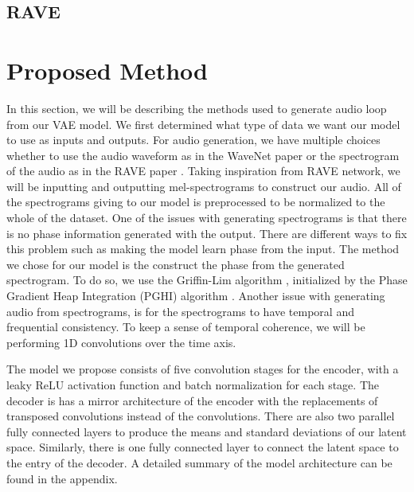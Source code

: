 \documentclass{article}
\begin{document}
\subsection{RAVE}


\newpage


\section{Proposed Method}


In this section, we will be describing the methods used to generate audio loop from our VAE model. 
We first determined what type of data we want our model to use as inputs and outputs. For audio generation, we have multiple choices whether to use the audio waveform as in the WaveNet paper \cite{oord2016wavenet} or the spectrogram of the audio as in the RAVE paper \cite{caillonRAVEVariationalAutoencoder2021}. Taking inspiration from RAVE network, we will be inputting and outputting mel-spectrograms to construct our audio. All of the spectrograms giving to our model is preprocessed to be normalized to the whole of the dataset. One of the issues with generating spectrograms is that there is no phase information generated with the output. There are different ways to fix this problem such as making the model learn phase from the input. The method we chose for our model is the construct the phase from the generated spectrogram. To do so, we use the Griffin-Lim algorithm \cite{griff1984}, initialized by the Phase Gradient Heap Integration (PGHI) algorithm \cite{pghi2017}.
Another issue with generating audio from spectrograms, is for the spectrograms to have temporal and frequential consistency. To keep a sense of temporal coherence, we will be performing 1D convolutions over the time axis.

The model we propose consists of five convolution stages for the encoder, with a leaky ReLU activation function and batch normalization for each stage. The decoder is has a mirror architecture of the encoder with the replacements of transposed convolutions instead of the convolutions. There are also two parallel fully connected layers to produce the means and standard deviations of our latent space. Similarly, there is one fully connected layer to connect the latent space to the entry of the decoder. A detailed summary of the model architecture can be found in the appendix.
\end{document}
